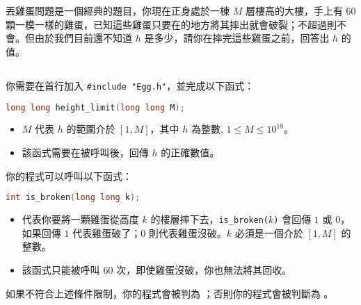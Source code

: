 


\section*{}
\subsection*{}
丟雞蛋問題是一個經典的題目，你現在正身處於一棟 $M$ 層樓高的大樓，手上有 $60$ 顆一模一樣的雞蛋，已知這些雞蛋只要在\bd{\color{red}{超過 $h$ 樓}}的地方將其摔出就會破裂；不超過則不會。但由於我們目前還不知道 $h$ 是多少，請你在摔完這些雞蛋之前，回答出 $h$ 的值。
\subsection*{}
\subsubsection*{}

你需要在首行加入 \texttt{\#include "Egg.h"}，並完成以下函式：

\begin{lstlisting}[language = C++]
long long height_limit(long long M);
\end{lstlisting}

\begin{itemize}
    \item $M$ 代表 $h$ 的範圍介於 $[1,M]$，其中 $h$ 為整數, $1\le M\le 10^{18}$。
    \item 該函式需要在被呼叫後，回傳 $h$ 的正確數值。
\end{itemize}

你的程式可以呼叫以下函式：

\begin{lstlisting}[language = C++]
int is_broken(long long k);
\end{lstlisting}

\begin{itemize}
    \item 代表你要將一顆雞蛋從高度 $k$ 的樓層摔下去，\texttt{is\_broken($k$)} 會回傳 $1$ 或 $0$，如果回傳 $1$ 代表雞蛋破了；$0$ 則代表雞蛋沒破。$k$ 必須是一個介於 $[1,M]$ 的整數。
    \item 該函式只能被呼叫 $60$ 次，即使雞蛋沒破，你也無法將其回收。
\end{itemize}

如果不符合上述條件限制，你的程式會被判為 ；否則你的程式會被判斷為 。


